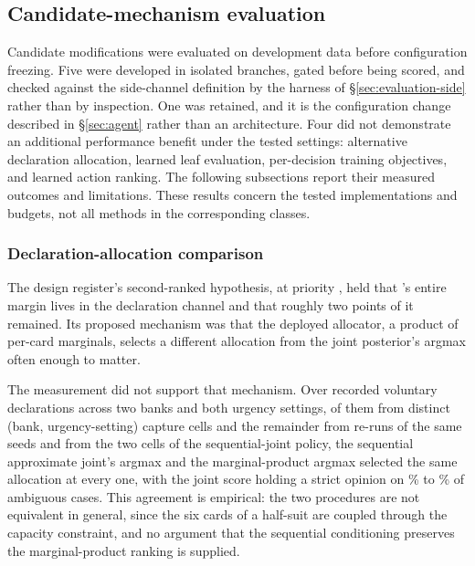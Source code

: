 \subsection{Candidate-mechanism evaluation}
\label{sec:development-rejected}

Candidate modifications were evaluated on development data before configuration freezing. Five
were developed in isolated branches, gated before being scored, and checked against the
side-channel definition by the harness of \S\ref{sec:evaluation-side} rather than by inspection.
One was retained, and it is the configuration change described in \S\ref{sec:agent} rather than an
architecture. Four did not demonstrate an additional performance benefit under the tested settings:
alternative declaration allocation, learned leaf evaluation, per-decision training objectives, and
learned action ranking. The following subsections report their measured outcomes and limitations.
These results concern the tested implementations and budgets, not all methods in the corresponding
classes.

\subsubsection{Declaration-allocation comparison}
\label{sec:development-alloc}

The design register's second-ranked hypothesis, at priority \vsevenLonePriority{}, held that
\vsix{}'s entire margin lives in the declaration channel and that roughly two points of it remained.
Its proposed mechanism was that the deployed allocator, a product of per-card marginals, selects a
different allocation from the joint posterior's argmax often enough to matter.

The measurement did not support that mechanism. Over \vsevenLoneDeclsTotal{} recorded voluntary
declarations across two banks and both urgency settings, \vsevenLoneDeclsDistinct{} of them from
distinct (bank, urgency-setting) capture cells and the remainder from re-runs of the same seeds and
from the two cells of the sequential-joint policy, the sequential approximate joint's argmax and
the marginal-product argmax selected the same allocation at every one, with the joint score holding a
strict opinion on \vsevenLoneStrictLo\% to \vsevenLoneStrictHi\% of ambiguous cases.
This agreement is empirical: the two procedures are not equivalent in general, since the six cards
of a half-suit are coupled through the capacity constraint, and no argument that the sequential
conditioning preserves the marginal-product ranking is supplied.

